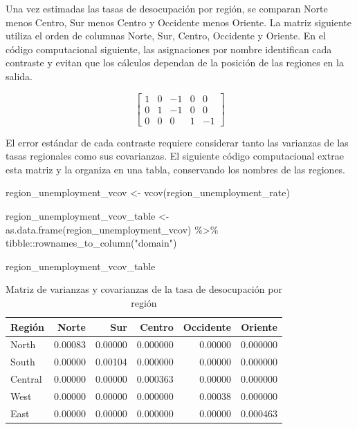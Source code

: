 \documentclass[
  spanish,
  11pt,
  letterpaper,
  oneside,
  open=any]{scrbook}
\newenvironment{Shaded}{\begin{snugshade}}{\end{snugshade}}
\newcommand{\FunctionTok}[1]{\textcolor[rgb]{0.28,0.35,0.67}{#1}}
\newcommand{\NormalTok}[1]{\textcolor[rgb]{0.00,0.23,0.31}{#1}}
\newcommand{\OtherTok}[1]{\textcolor[rgb]{0.00,0.23,0.31}{#1}}
\newcommand{\SpecialCharTok}[1]{\textcolor[rgb]{0.37,0.37,0.37}{#1}}
\newcommand{\StringTok}[1]{\textcolor[rgb]{0.13,0.47,0.30}{#1}}
\begin{document}
Una vez estimadas las tasas de desocupación por región, se comparan
Norte menos Centro, Sur menos Centro y Occidente menos Oriente. La
matriz siguiente utiliza el orden de columnas Norte, Sur, Centro,
Occidente y Oriente. En el código computacional siguiente, las
asignaciones por nombre identifican cada contraste y evitan que los
cálculos dependan de la posición de las regiones en la salida.

\[
\left[\begin{array}{ccccc}
1 & 0 & -1 & 0 & 0\\
0 & 1 & -1 & 0 & 0\\
0 & 0 & 0 & 1 & -1
\end{array}\right]
\]

El error estándar de cada contraste requiere considerar tanto las
varianzas de las tasas regionales como sus covarianzas. El siguiente
código computacional extrae esta matriz y la organiza en una tabla,
conservando los nombres de las regiones.

\begin{Shaded}
\begin{Highlighting}[]
\NormalTok{region\_unemployment\_vcov }\OtherTok{\textless{}{-}} \FunctionTok{vcov}\NormalTok{(region\_unemployment\_rate)}

\NormalTok{region\_unemployment\_vcov\_table }\OtherTok{\textless{}{-}} \FunctionTok{as.data.frame}\NormalTok{(region\_unemployment\_vcov) }\SpecialCharTok{\%\textgreater{}\%}
\NormalTok{  tibble}\SpecialCharTok{::}\FunctionTok{rownames\_to\_column}\NormalTok{(}\StringTok{"domain"}\NormalTok{)}

\NormalTok{region\_unemployment\_vcov\_table}
\end{Highlighting}
\end{Shaded}

{

\begin{longtable}[]{@{}lrrrrr@{}}

\caption{\label{tbl-vcov-desocupacion-region}Matriz de varianzas y
covarianzas de la tasa de desocupación por región}

\tabularnewline

\toprule\noalign{}
Región & Norte & Sur & Centro & Occidente & Oriente \\
\midrule\noalign{}
\endhead
\bottomrule\noalign{}
\endlastfoot
North & 0.00083 & 0.00000 & 0.000000 & 0.00000 & 0.000000 \\
South & 0.00000 & 0.00104 & 0.000000 & 0.00000 & 0.000000 \\
Central & 0.00000 & 0.00000 & 0.000363 & 0.00000 & 0.000000 \\
West & 0.00000 & 0.00000 & 0.000000 & 0.00038 & 0.000000 \\
East & 0.00000 & 0.00000 & 0.000000 & 0.00000 & 0.000463 \\

\end{longtable}

}
\end{document}
